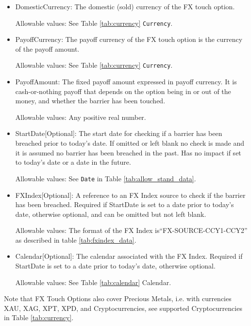 \begin{itemize}
\item DomesticCurrency: The domestic (sold) currency of the FX touch option.

Allowable values:  See Table \ref{tab:currency} \lstinline!Currency!.

\item PayoffCurrency: The payoff currency of the FX touch option is the currency of the payoff amount. 

Allowable values:  See Table \ref{tab:currency} \lstinline!Currency!.

\item PayoffAmount: The fixed payoff amount expressed in payoff currency. It is cash-or-nothing payoff that depends on the option being in or out of the money, and whether the barrier has been touched.

Allowable values:  Any positive real number.

\item StartDate[Optional]: The start date for checking if a barrier has been breached prior to today's date.  If omitted or left blank no check is made and it is assumed no barrier has been breached in the past. Has no impact if set to today's date or a date in the future.

Allowable values:  See \lstinline!Date! in Table \ref{tab:allow_stand_data}.

\item FXIndex[Optional]: A reference to an FX Index source to check if the barrier has been breached. Required if StartDate is set to a date prior to today's date, otherwise optional, and can be omitted but not left blank.

Allowable values: The format of the FX Index is``FX-SOURCE-CCY1-CCY2'' as described in table \ref{tab:fxindex_data}.  

\item Calendar[Optional]: The calendar associated with the FX Index. Required if StartDate is set to a date prior to today's date, otherwise optional.

Allowable values: See Table \ref{tab:calendar} Calendar.
\end{itemize}

Note that FX Touch Options also cover Precious Metals, i.e. with
currencies XAU, XAG, XPT, XPD, and Cryptocurrencies,  see supported Cryptocurrencies in Table \ref{tab:currency}.